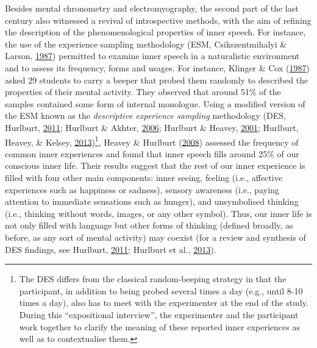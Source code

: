\documentclass[a4paper,12pt,twoside,openright,oldfontcommands]{memoir}
\let\rmarkdownfootnote\footnote%
\def\footnote{\protect\rmarkdownfootnote}
\begin{document}
Besides mental chronometry and electromyography, the second part of the last century also witnessed a revival of introspective methods, with the aim of refining the description of the phenomenological properties of inner speech. For instance, the use of the experience sampling methodology (ESM, Csikszentmihalyi \& Larson, \protect\hyperlink{ref-csikszentmihalyi_validity_1987}{1987}) permitted to examine inner speech in a naturalistic environment and to assess its frequency, forms and usages. For instance, Klinger \& Cox (\protect\hyperlink{ref-klinger_dimensions_1987}{1987}) asked 29 students to carry a beeper that probed them randomly to described the properties of their mental activity. They observed that around 51\% of the samples contained some form of internal monologue. Using a modified version of the ESM known as the \emph{descriptive experience sampling} methodology (DES, Hurlburt, \protect\hyperlink{ref-Hurlburt2011}{2011}; Hurlburt \& Akhter, \protect\hyperlink{ref-hurlburt_descriptive_2006}{2006}; Hurlburt \& Heavey, \protect\hyperlink{ref-Hurlburt2001}{2001}; Hurlburt, Heavey, \& Kelsey, \protect\hyperlink{ref-Hurlburt2013}{2013})\footnote{The DES differs from the classical random-beeping strategy in that the participant, in addition to being probed several times a day (e.g., until 8-10 times a day), also has to meet with the experimenter at the end of the study. During this \enquote{expositional interview}, the experimenter and the participant work together to clarify the meaning of these reported inner experiences as well as to contextualise them.}, Heavey \& Hurlburt (\protect\hyperlink{ref-heavey_phenomena_2008}{2008}) assessed the frequency of common inner experiences and found that inner speech fills around 25\% of our conscious inner life. Their results suggest that the rest of our inner experience is filled with four other main components: inner seeing, feeling (i.e., affective experiences such as happiness or sadness), sensory awareness (i.e., paying attention to immediate sensations such as hunger), and unsymbolised thinking (i.e., thinking without words, images, or any other symbol). Thus, our inner life is not only filled with language but other forms of thinking (defined broadly, as before, as any sort of mental activity) may coexist (for a review and synthesis of DES findings, see Hurlburt, \protect\hyperlink{ref-Hurlburt2011}{2011}; Hurlburt et al., \protect\hyperlink{ref-Hurlburt2013}{2013}).
\end{document}
